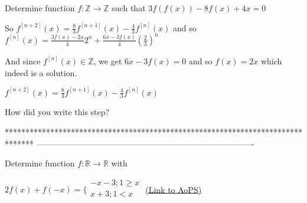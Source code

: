 \begin{solution}
	\begin{tcolorbox}Determine function $f: \mathbb{Z}\to\mathbb{Z}$ such that $3f(f(x))-8f(x)+4x=0$\end{tcolorbox}
So $f^{[n+2]}(x)=\frac 83f^{[n+1]}(x)-\frac 43f^{[n]}(x)$ and so $f^{[n]}(x)=\frac{3f(x)-2x}42^n+\frac{6x-3f(x)}4\left(\frac 23\right)^n$

And since $f^{[n]}(x)\in\mathbb Z$, we get $6x-3f(x)=0$ and so $\boxed{f(x)=2x}$ which indeed is a solution.
\end{solution}



\begin{solution}
	\begin{tcolorbox}$f^{[n+2]}(x)=\frac 83f^{[n+1]}(x)-\frac 43f^{[n]}(x)$\end{tcolorbox}How did you write this step?
\end{solution}



*******************************************************************************
-------------------------------------------------------------------------------

\begin{problem}
	Determine function $f:\mathbb{R}\to\mathbb{R}$ with

$2f(x)+f(-x)= \{\begin{array}{l}-x-3; 1\ge x \\x+3; 1<x\\ \end{array}$
	\flushright \href{https://artofproblemsolving.com/community/c6h476391}{(Link to AoPS)}
\end{problem}



